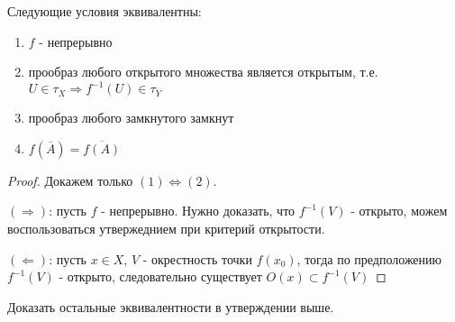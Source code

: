 \begin{statement}
    Следующие условия эквивалентны:
    \begin{enumerate}
        \item $f$ - непрерывно
        \item прообраз любого открытого множества является открытым, т.е. $U \in \tau_{X} \Rightarrow f^{-1}(U) \in \tau_{Y}$
        \item прообраз любого замкнутого замкнут
        \item $f(\overline{A}) = \overline{f(A)}$ 
    \end{enumerate}
\end{statement}
\begin{proof}
    Докажем только $(1) \Leftrightarrow (2)$.

    $(\Rightarrow)$: пусть $f$ - непрерывно. Нужно доказать, что $f^{-1}(V)$ - открыто, можем воспользоваться утвержеднием при критерий открытости.


    $(\Leftarrow)$: пусть $x \in X$, $V$ - окрестность точки $f(x_0)$, тогда по предположению $f^{-1}(V)$ - открыто, следовательно существует $O(x) \subset f^{-1}(V)$
\end{proof}

\begin{exercise}
    Доказать остальные эквивалентности в утверждении выше.
\end{exercise}
